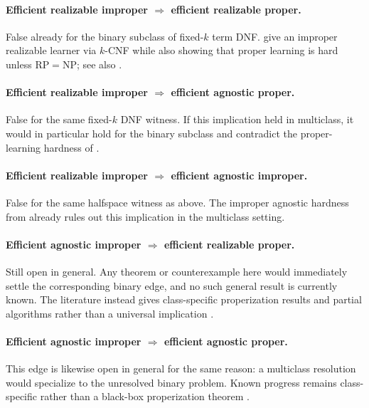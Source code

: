 \paragraph{Efficient realizable improper $\Rightarrow$ efficient realizable proper.}
False already for the binary subclass of fixed-$k$ term DNF. \citet{pitt1988} give an improper realizable learner via $k$-CNF while also showing that proper learning is hard unless $\mathrm{RP}=\mathrm{NP}$; see also \citet{haussler1990}.

\paragraph{Efficient realizable improper $\Rightarrow$ efficient agnostic proper.}
False for the same fixed-$k$ DNF witness. If this implication held in multiclass, it would in particular hold for the binary subclass and contradict the proper-learning hardness of \citet{pitt1988}.

\paragraph{Efficient realizable improper $\Rightarrow$ efficient agnostic improper.}
False for the same halfspace witness as above. The improper agnostic hardness from \citet{tiegel2023} already rules out this implication in the multiclass setting.

\paragraph{Efficient agnostic improper $\Rightarrow$ efficient realizable proper.}
Still open in general. Any theorem or counterexample here would immediately settle the corresponding binary edge, and no such general result is currently known. The literature instead gives class-specific properization results and partial algorithms rather than a universal implication \citep{diakonikolas2021,lange2023,diakonikolas2025disjunctions}.

\paragraph{Efficient agnostic improper $\Rightarrow$ efficient agnostic proper.}
This edge is likewise open in general for the same reason: a multiclass resolution would specialize to the unresolved binary problem. Known progress remains class-specific rather than a black-box properization theorem \citep{diakonikolas2021,lange2023}.

